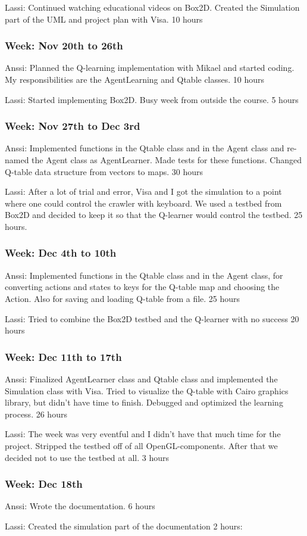 \documentclass{article}
\begin{document}
Lassi:
Continued watching educational videos on Box2D. Created the Simulation 
part of the UML and project plan with Visa. 
10 hours

\subsubsection{Week: Nov 20th to 26th}
Anssi:
Planned the Q-learning implementation with Mikael and started coding.
My responsibilities are the AgentLearning and Qtable classes.
10 hours

Lassi:
Started implementing Box2D. Busy week from outside the course.
5 hours

\subsubsection{Week: Nov 27th to Dec 3rd}
Anssi:
Implemented functions in the Qtable class and in the Agent class and
re-named the Agent class as AgentLearner. Made tests for these functions.
Changed Q-table data structure from vectors to maps.
30 hours

Lassi:
After a lot of trial and error, Visa and I got the simulation to a point 
where one could control the crawler with keyboard. We used a testbed from 
Box2D and decided to keep it so that the Q-learner would control the testbed.
25 hours.

\subsubsection{Week: Dec 4th to 10th}
Anssi:
Implemented functions in the Qtable class and in the Agent class, for
converting actions and states to keys for the Q-table map and choosing
the Action. Also for saving and loading Q-table from a file.
25 hours

Lassi: Tried to combine the Box2D testbed and the Q-learner with no success
20 hours

\subsubsection{Week: Dec 11th to 17th}
Anssi:
Finalized AgentLearner class and Qtable class and implemented the
Simulation class with Visa. Tried to visualize the Q-table with
Cairo graphics library, but didn’t have time to finish. Debugged
and optimized  the learning process.
26 hours

Lassi:
The week was very eventful and I didn't have that much time for the project.
Stripped the testbed off of all OpenGL-components. After that we decided not
to use the testbed at all.
3 hours

\subsubsection{Week: Dec 18th}
Anssi:
Wrote the documentation.
6 hours

Lassi:
Created the simulation part of the documentation
2 hours:
\end{document}
